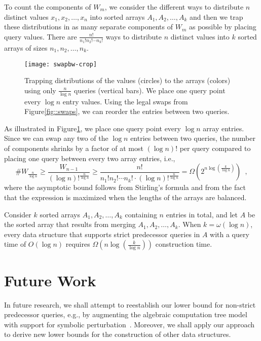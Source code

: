 \documentclass[orivec]{llncs}
\begin{document}
To count the components of \(W_m\), we consider the different ways to distribute \(n\) distinct values \(x_1, x_2, \dots, x_n\) into sorted arrays \(A_1,A_2,\dots, A_k\) and then we trap these distributions in as many separate components of \(W_m\) as possible by placing query values. There are \(\frac{n!}{n_1! n_2! \cdots n_k!}\) ways to distribute \(n\) distinct values into \(k\) sorted arrays of sizes \(n_1,n_2,\dots, n_k\).
\begin{figure}[ht]
	\centering \vspace{-\baselineskip}
	\texttt{[image: swapbw-crop]}
	\caption{Trapping distributions of the values (circles) to the arrays (colors) using only \(\frac{n}{\log n}\) queries (vertical bars). We place one query point every \(\log n\) entry values. Using the legal swaps from Figure\nobreakspace \ref {fig::swaps}, we can reorder the entries between two queries. \label{fig::trapmany}} \vspace{-\baselineskip}
\end{figure}

As illustrated in Figure\nobreakspace \ref {fig::trapmany}, we place one query point every \(\log n\) array entries. Since we can swap any two of the \(\log n\) entries between two queries, the number of components shrinks by a factor of at most \((\log n)!\) per query compared to placing one query between every two array entries, i.e.,
\[
	\#W_{\frac{n}{\log n}} \ge \dfrac{W_{n-1}}{(\log n)!^{\frac{n}{\log n}}} \ge \dfrac{n!}{n_1! n_2! \cdots n_k! \cdot (\log n)!^{\frac{n}{\log n}}}  = \Omega\left(2^{n \log( \frac{k}{\log n})}\right) \enspace,
\] 
where the asymptotic bound follows from Stirling's formula and from the fact that the expression is maximized when the lengths of the arrays are balanced.
\begin{theorem} Consider \(k\) sorted arrays \(A_1,A_2,\dots, A_k\) containing \(n\) entries in total, and let \(A\) be the sorted array that results from merging \(A_1,A_2,\dots, A_k\). 
When \(k = \omega(\log n)\), every data structure that supports strict predecessor queries in \(A\) with a query time of \(O(\log n)\) requires \(  \Omega (n \log( \frac{k}{\log n}) ) \) construction time. 
\end{theorem}


\section{Future Work} \label{sec::conclusion}



In future research, we shall attempt to reestablish our lower bound for non-strict predecessor queries, e.g., by augmenting the algebraic computation tree model with support for symbolic perturbation~\cite{emiris1995general}. Moreover, we shall apply our approach to derive new lower bounds for the construction of other data structures.
 

{}

\end{document}
